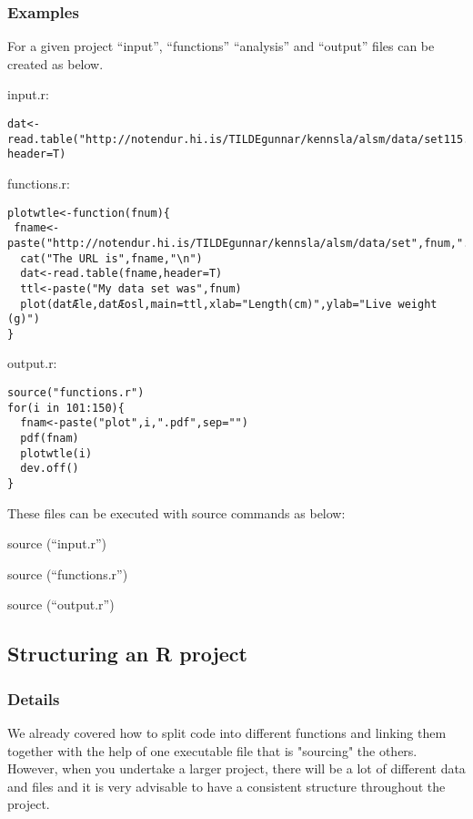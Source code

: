\documentclass[12pt,a4paper]{article}
\theoremstyle{regla}
\theoremstyle{remark}
\theoremstyle{definition}
\theoremstyle{nonumberbreak}
\begin{document}
\subsubsection{Examples}
\begin{xmpl}
For a given project “input”, “functions” “analysis” and “output” files can be created as below. 

input.r:
\begin{lstlisting}
dat<-read.table("http://notendur.hi.is/TILDEgunnar/kennsla/alsm/data/set115.dat", header=T)
\end{lstlisting}

functions.r:
\begin{lstlisting}
plotwtle<-function(fnum){
 fname<-paste("http://notendur.hi.is/TILDEgunnar/kennsla/alsm/data/set",fnum,".dat",sep="")
  cat("The URL is",fname,"\n")
  dat<-read.table(fname,header=T)
  ttl<-paste("My data set was",fnum)
  plot(datÆle,datÆosl,main=ttl,xlab="Length(cm)",ylab="Live weight (g)")
}
\end{lstlisting}

output.r:
\begin{lstlisting}
source("functions.r")
for(i in 101:150){
  fnam<-paste("plot",i,".pdf",sep="")
  pdf(fnam)
  plotwtle(i)
  dev.off()
}
\end{lstlisting}

These files can be executed with source commands as below:
\begin{description}
\item source (“input.r”)
\item source (“functions.r”)
\item source (“output.r”)
\end{description}
		
\end{xmpl}


\subsection{Structuring an R project}
\subsubsection{Details}
We already covered how to split code into different functions and linking them together with the help of one executable file that is "sourcing" the others. 
However, when you undertake a larger project, there will be a lot of different data and files and it is very advisable to have a consistent structure 
throughout the project.\\ 
\end{document}
